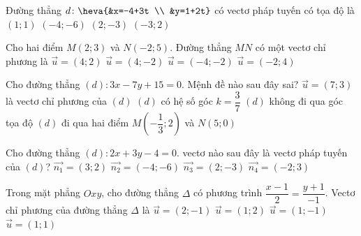 \begin{ex}%
	Đường thẳng $d\colon\heva{&x=-4+3t \\ 
	&y=1+2t}$ có  vectơ pháp tuyến có tọa độ là
	 \choice
		{$(1; 1)$} 
		{$(-4;-6)$} 
		{\True $(2;-3)$} 
		{$(-3;  2)$}
\end{ex}

\begin{ex}%
	Cho hai điểm $M(2; 3)$ và $N(-2; 5)$. Đường thẳng  $MN$ có một vectơ chỉ phương là
	\choice 
		{$\overrightarrow{u}=(4;  2)$}
		{\True $\overrightarrow{u}=(4;-2)$} 
		 {$\overrightarrow{u}=(-4;-2)$}
		{$\overrightarrow{u}=(-2;  4)$}
\end{ex}

\begin{ex}%
	Cho đường thẳng $(d)\colon 3x-7y+15=0$. Mệnh đề nào sau  đây sai?
	\choice 
		{$\overrightarrow{u}=\left(7;3\right)$ là  vectơ chỉ phương của $(d)$}
		{$(d)$  có hệ số góc $k=\dfrac{3}{7}$}
		{$(d)$ không  đi qua góc tọa độ}
		{\True $(d)$ đi qua hai điểm $M\left(-\dfrac{1}{3};2\right)$ và $N\left(5;0\right)$} 
\end{ex}

\begin{ex}%
	Cho đường thẳng $(d)\colon 2x+3y-4=0$. vectơ nào sau đây là vectơ pháp tuyến của $(d)$? 
	\choice 
		{$\overrightarrow{n_1}=\left(3;2\right)$} 
		 {\True $\overrightarrow{n_2}=\left(-4;-6\right)$}
		{$\overrightarrow{n_3}=\left(2;-3\right)$} 
		 {$\overrightarrow{n_4}=\left(-2;3\right)$}
\end{ex}

\begin{ex}%
	Trong mặt phẳng $Oxy$, cho đường  thẳng $\Delta$ có phương trình $\dfrac{x-1}{2}=\dfrac{y+1}{-1}$. Vectơ chỉ phương của đường thẳng $\Delta$ là
	 \choice
		{\True $\overrightarrow{u}=(2;-1)$} 
		{$\overrightarrow{u}=(1;  2)$}
		 {$\overrightarrow{u}=(1;-1)$}
		 {$\overrightarrow{u}=(1; 1)$}
\end{ex}

